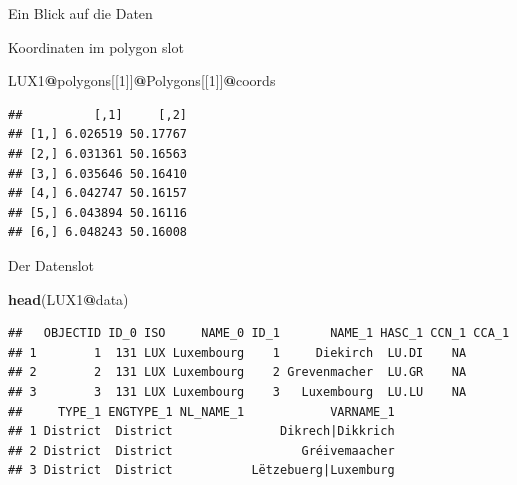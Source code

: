 \documentclass[ignorenonframetext,]{beamer}
\newenvironment{Shaded}{\begin{snugshade}}{\end{snugshade}}
\newcommand{\DecValTok}[1]{\textcolor[rgb]{0.00,0.00,0.81}{#1}}
\newcommand{\KeywordTok}[1]{\textcolor[rgb]{0.13,0.29,0.53}{\textbf{#1}}}
\newcommand{\NormalTok}[1]{#1}
\newcommand{\OperatorTok}[1]{\textcolor[rgb]{0.81,0.36,0.00}{\textbf{#1}}}
\begin{document}
\begin{frame}[fragile]{Ein Blick auf die Daten}
\protect\hypertarget{ein-blick-auf-die-daten}{}

Koordinaten im polygon slot

\begin{Shaded}
\begin{Highlighting}[]
\NormalTok{LUX1}\OperatorTok{@}\NormalTok{polygons[[}\DecValTok{1}\NormalTok{]]}\OperatorTok{@}\NormalTok{Polygons[[}\DecValTok{1}\NormalTok{]]}\OperatorTok{@}\NormalTok{coords}
\end{Highlighting}
\end{Shaded}

\begin{verbatim}
##          [,1]     [,2]
## [1,] 6.026519 50.17767
## [2,] 6.031361 50.16563
## [3,] 6.035646 50.16410
## [4,] 6.042747 50.16157
## [5,] 6.043894 50.16116
## [6,] 6.048243 50.16008
\end{verbatim}

\end{frame}

\begin{frame}[fragile]{Der Datenslot}
\protect\hypertarget{der-datenslot-1}{}

\begin{Shaded}
\begin{Highlighting}[]
\KeywordTok{head}\NormalTok{(LUX1}\OperatorTok{@}\NormalTok{data)}
\end{Highlighting}
\end{Shaded}

\begin{verbatim}
##   OBJECTID ID_0 ISO     NAME_0 ID_1       NAME_1 HASC_1 CCN_1 CCA_1
## 1        1  131 LUX Luxembourg    1     Diekirch  LU.DI    NA      
## 2        2  131 LUX Luxembourg    2 Grevenmacher  LU.GR    NA      
## 3        3  131 LUX Luxembourg    3   Luxembourg  LU.LU    NA      
##     TYPE_1 ENGTYPE_1 NL_NAME_1            VARNAME_1
## 1 District  District               Dikrech|Dikkrich
## 2 District  District                  Gréivemaacher
## 3 District  District           Lëtzebuerg|Luxemburg
\end{verbatim}

\end{frame}
\end{document}
